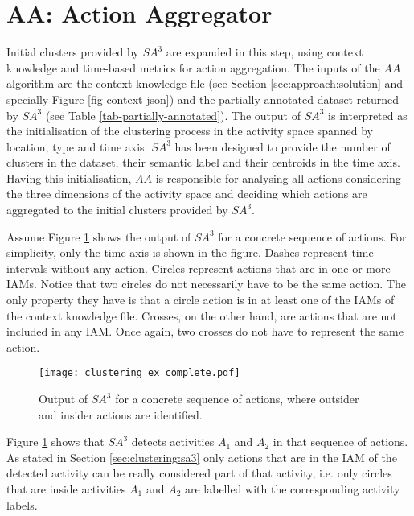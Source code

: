 \section{AA: Action Aggregator}
\label{sec:clustering:ac}

Initial clusters provided by $SA^3$ are expanded in this step, using context knowledge and time-based metrics for action aggregation. The inputs of the $AA$ algorithm are the context knowledge file (see Section \ref{sec:approach:solution} and specially Figure \ref{fig-context-json}) and the partially annotated dataset returned by $SA^3$ (see Table \ref{tab-partially-annotated}). The output of $SA^3$ is interpreted as the initialisation of the clustering process in the activity space spanned by location, type and time axis. $SA^3$ has been designed to provide the number of clusters in the dataset, their semantic label and their centroids in the time axis. Having this initialisation, $AA$ is responsible for analysing all actions considering the three dimensions of the activity space and deciding which actions are aggregated to the initial clusters provided by $SA^3$.

Assume Figure \ref{fig-initial-clusters} shows the output of $SA^3$ for a concrete sequence of actions. For simplicity, only the time axis is shown in the figure. Dashes represent time intervals without any action. Circles represent actions that are in one or more IAMs. Notice that two circles do not necessarily have to be the same action. The only property they have is that a circle action is in at least one of the IAMs of the context knowledge file. Crosses, on the other hand, are actions that are not included in any IAM. Once again, two crosses do not have to represent the same action. 

\begin{figure}[htbp]%
\centering
\texttt{[image: clustering\_ex\_complete.pdf]}
    \caption{Output of $SA^3$ for a concrete sequence of actions, where outsider and insider actions are identified.}
    \label{fig-initial-clusters}
\end{figure}

Figure \ref{fig-initial-clusters} shows that $SA^3$ detects activities $A_1$ and $A_2$ in that sequence of actions. As stated in Section \ref{sec:clustering:sa3} only actions that are in the IAM of the detected activity can be really considered part of that activity, i.e. only circles that are inside activities $A_1$ and $A_2$ are labelled with the corresponding activity labels. 

